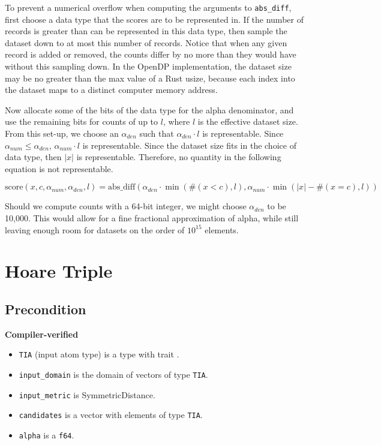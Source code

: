 \documentclass{article}
\begin{document}
To prevent a numerical overflow when computing the arguments to \texttt{abs\_diff},  
first choose a data type that the scores are to be represented in. 
If the number of records is greater than can be represented in this data type,  
then sample the dataset down to at most this number of records. 
Notice that when any given record is added or removed,  
the counts differ by no more than they would have without this sampling down. 
In the OpenDP implementation, the dataset size may be no greater than the max value of a Rust usize,  
because each index into the dataset maps to a distinct computer memory address. 
 
Now allocate some of the bits of the data type for the alpha denominator, 
and use the remaining bits for counts of up to $l$, where $l$ is the effective dataset size. 
From this set-up, we choose an $\alpha_{den}$ such that $\alpha_{den} \cdot l$ is representable. 
Since $\alpha_{num} \le \alpha_{den}$, $\alpha_{num} \cdot l$ is representable. 
Since the dataset size fits in the choice of data type, then $|x|$ is representable. 
Therefore, no quantity in the following equation is not representable. 
 
\begin{equation} 
    \textrm{score}(x, c, \alpha_{num}, \alpha_{den}, l) = \mathrm{abs\_diff}(\alpha_{den} \cdot \min(\#(x < c), l), \alpha_{num} \cdot \min(|x| - \#(x = c), l)) 
\end{equation} 
 
Should we compute counts with a 64-bit integer, we might choose $\alpha_{den}$ to be 10,000. 
This would allow for a fine fractional approximation of alpha, 
while still leaving enough room for datasets on the order of $10^{15}$ elements. 
 
\section{Hoare Triple} 
\subsection*{Precondition} 
\textbf{Compiler-verified}
\begin{itemize} 
    \item \texttt{TIA} (input atom type) is a type with trait . 
    \item \texttt{input\_domain} is the domain of vectors of type \texttt{TIA}.
    \item \texttt{input\_metric} is SymmetricDistance.
    \item \texttt{candidates} is a vector with elements of type \texttt{TIA}.
    \item \texttt{alpha} is a \texttt{f64}.
\end{itemize} 
\end{document}
